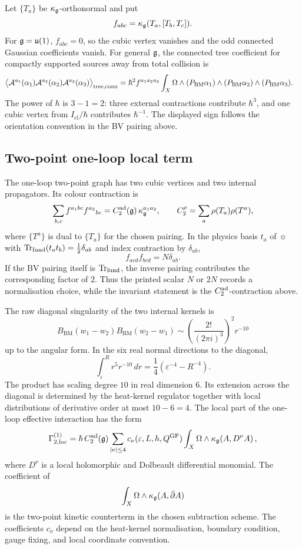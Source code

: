 Let \(\{T_a\}\) be \(\kappa_{\mathfrak{g}}\)-orthonormal and put
\[
  f_{abc}=\kappa_{\mathfrak{g}}(T_a,[T_b,T_c]).
\]
For \(\mathfrak{g}=\mathfrak{u}(1)\), \(f_{abc}=0\), so the cubic vertex vanishes and
the odd connected Gaussian coefficients vanish.  For general
\(\mathfrak{g}\), the connected tree coefficient for compactly supported
sources away from total collision is
\[
\begin{aligned}
 \bigl\langle
  \mathcal{A}^{a_1}(\alpha_1)\mathcal{A}^{a_2}(\alpha_2)\mathcal{A}^{a_3}(\alpha_3)
 \bigr\rangle_{\mathrm{tree,conn}}
 &=
 \hbar^2 f^{a_1a_2a_3}
 \int_X\Omega\wedge
  (P_{\mathrm{BM}}\alpha_1)\wedge
  (P_{\mathrm{BM}}\alpha_2)\wedge
  (P_{\mathrm{BM}}\alpha_3).
\end{aligned}
\]
The power of \(\hbar\) is \(3-1=2\): three external contractions
contribute \(\hbar^3\), and one cubic vertex from
\(I_{\mathrm{cl}}/\hbar\) contributes \(\hbar^{-1}\).  The displayed
sign follows the orientation convention in the BV pairing above.

\subsection{Two-point one-loop local term}

The one-loop two-point graph has two cubic vertices and two internal
propagators.  Its colour contraction is
\[
  \sum_{b,c}f^{a_1bc}f^{a_2}{}_{bc}
  =
  C_2^{\mathrm{ad}}(\mathfrak{g})\,\kappa_{\mathfrak{g}}^{a_1a_2},
  \qquad
  C_2^{\rho}=\sum_a\rho(T_a)\rho(T^a),
\]
where \(\{T^a\}\) is dual to \(\{T_a\}\) for the chosen pairing.  In the
physics basis \(t_a\) of \(\sun\) with
\(\operatorname{Tr}_{\mathrm{fund}}(t_at_b)=\frac12\delta_{ab}\) and index contraction
by \(\delta_{ab}\),
\[
  f_{acd}f_{bcd}=N\delta_{ab}.
\]
If the BV pairing itself is \(\operatorname{Tr}_{\mathrm{fund}}\), the inverse
pairing contributes the corresponding factor of \(2\).  Thus the
printed scalar \(N\) or \(2N\) records a normalisation choice, while the
invariant statement is the \(C_2^{\mathrm{ad}}\)-contraction above.

The raw diagonal singularity of the two internal kernels is
\[
  B_{\mathrm{BM}}(w_1-w_2)B_{\mathrm{BM}}(w_2-w_1)
  \sim
  \left(\frac{2!}{(2\pi i)^3}\right)^2 r^{-10}
\]
up to the angular form.  In the six real normal directions to the
diagonal,
\[
  \int_{\varepsilon}^{R} r^5r^{-10}\,dr
  =
  \frac14(\varepsilon^{-4}-R^{-4}).
\]
The product has scaling degree \(10\) in real dimension \(6\).  Its
extension across the diagonal is determined by the heat-kernel
regulator together with local distributions of derivative order at most
\(10-6=4\).  The local part of the one-loop effective interaction has
the form
\[
  \Gamma^{(1)}_{2,\mathrm{loc}}
  =
  \hbar\,C_2^{\mathrm{ad}}(\mathfrak{g})
  \sum_{|\nu|\le4}c_{\nu}(\varepsilon,L,h,Q^{\mathrm{GF}})
  \int_X\Omega\wedge
  \kappa_{\mathfrak{g}}\!\left(A,D^{\nu}A\right),
\]
where \(D^{\nu}\) is a local holomorphic and Dolbeault differential
monomial.  The coefficient of
\[
  \int_X\Omega\wedge\kappa_{\mathfrak{g}}(A,\bar\partial A)
\]
is the two-point kinetic counterterm in the chosen subtraction scheme.
The coefficients \(c_{\nu}\) depend on the heat-kernel normalisation,
boundary condition, gauge fixing, and local coordinate convention.

